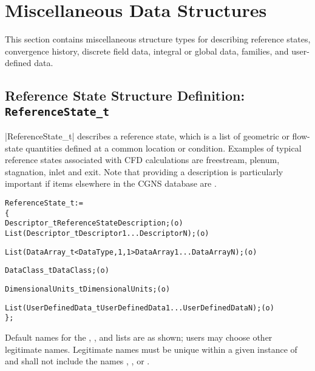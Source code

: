\section{Miscellaneous Data Structures}
\label{s:misc}
\thispagestyle{plain}

This section contains miscellaneous structure types for describing
reference states, convergence history, discrete field data, integral or
global data, families, and user-defined data.

\subsection{Reference State Structure Definition: \texttt{ReferenceState\_t}}
\label{s:ReferenceState}

|ReferenceState_t| describes a reference state, which is a list of
geometric or flow-state quantities defined at a common location or
condition.
Examples of typical reference states associated with CFD calculations
are freestream, plenum, stagnation, inlet and exit.
Note that providing a  description is particularly
important if items elsewhere in the CGNS database are
.

\begin{alltt}
  ReferenceState\_t :=
    \{
    Descriptor\_t ReferenceStateDescription ;                                (o)
    List( Descriptor\_t Descriptor1 ... DescriptorN ) ;                      (o)

    List( DataArray\_t<DataType, 1, 1> DataArray1 ... DataArrayN ) ;         (o)

    DataClass\_t DataClass ;                                                 (o)
                
    DimensionalUnits\_t DimensionalUnits ;                                   (o)

    List( UserDefinedData\_t UserDefinedData1 ... UserDefinedDataN ) ;       (o)
    \} ;
\end{alltt}

\begin{notes}
\item
 Default names for the , , and
 lists are as shown; users may choose other legitimate names.
 Legitimate names must be unique within a given instance of
  and shall not include the names ,
 , or .
\end{notes}

